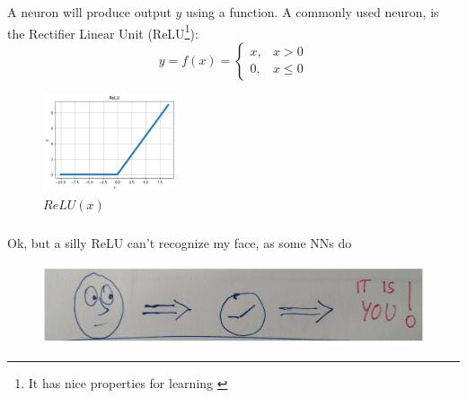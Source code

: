 \documentclass{beamer}
\begin{document}
\begin{frame}
    \frametitle{\insertsection}
    \framesubtitle{\insertsubsection}

    A neuron will produce output $y$ using a function. A commonly used neuron, is the Rectifier Linear Unit (ReLU\footnote{It has nice properties for learning \href{http://tex.stackexchange.com/q/20800/5701}{}}):
    \begin{equation*}
        y=f(x)=\begin{cases}
            x,& x>0\\
            0, & x\le 0
        \end{cases}
    \end{equation*}
    \begin{figure}
        \centering
        \includegraphics[width=0.35\textwidth]{img/relu.png}
        \caption{$ReLU(x)$}
        \label{fig:fx-nn}
    \end{figure}
\end{frame}




\begin{frame}
    \frametitle{\insertsection}
    \framesubtitle{}

    Ok, but a silly ReLU can't recognize my face, as some NNs do
    \begin{figure}
        \centering
        \includegraphics[width=\textwidth]{img/face.jpg}
        \caption{}
        \label{fig:face}
    \end{figure}
\end{frame}
\end{document}
